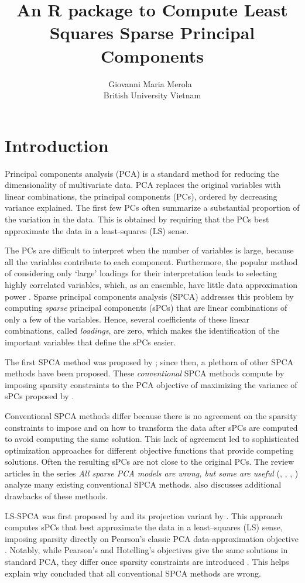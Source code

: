 \documentclass[article]{jss}
\author{Giovanni Maria Merola~\orcidlink{0000-0003-2539-9225}\\
British University Vietnam}
\title{An R package to Compute Least Squares Sparse Principal Components}
\begin{document}



\section{Introduction}
Principal components analysis (PCA) is a standard method for reducing the dimensionality of multivariate data. PCA replaces the original variables with linear combinations, the principal components (PCs), ordered by decreasing variance explained. The first few PCs often summarize a substantial proportion of the variation in the data. This is obtained by requiring that the PCs best approximate the data in a least-squares (LS) sense.

The PCs are difficult to interpret when the number of variables is large, because all the variables contribute to each component. Furthermore, the popular method of considering only `large' loadings for their interpretation leads to selecting highly correlated variables, which, as an ensemble, have little data approximation power \citep{mer20}. Sparse principal components analysis (SPCA) addresses this problem by computing \emph{sparse} principal components (sPCs) that are linear combinations of only a few of the variables. Hence, several coefficients of these linear combinations, called \emph{loadings}, are zero, which makes the identification of the important variables that define the sPCs easier. 


The first SPCA method was proposed by \cite{tre}; since then, a plethora of other SPCA methods have been proposed. These \emph{conventional} SPCA methods compute by imposing sparsity constraints to the PCA objective of maximizing the variance of sPCs proposed by \citet{hot}. 

Conventional SPCA methods differ because there is no agreement on the sparsity constraints to impose and on how to transform the data after sPCs are computed to avoid computing the same solution. This lack of agreement led to sophisticated optimization approaches for different objective functions that provide competing solutions. Often the resulting sPCs are not close to the original PCs. The review articles in the series \emph{All sparse PCA models are wrong, but some are useful} (\citeauthor{camI}, \citeyear{camI}, \citeyear{camII}, \citeyear{camIII}) analyze many existing conventional SPCA methods. \citet{mer19} also discusses additional drawbacks of these methods.

LS-SPCA was first proposed by \citet{mer15} and its projection variant by \citet{mer19}. This approach computes sPCs that best approximate the data in a least--squares (LS) sense, imposing sparsity directly on Pearson's classic PCA data-approximation objective \citep{pea}. Notably, while Pearson's and Hotelling's objectives give the same solutions in standard PCA, they differ once sparsity constraints are introduced \citep{mer15, mer19}. This helps explain why \citeauthor{camI} concluded that all conventional SPCA methods are wrong.
\end{document}
